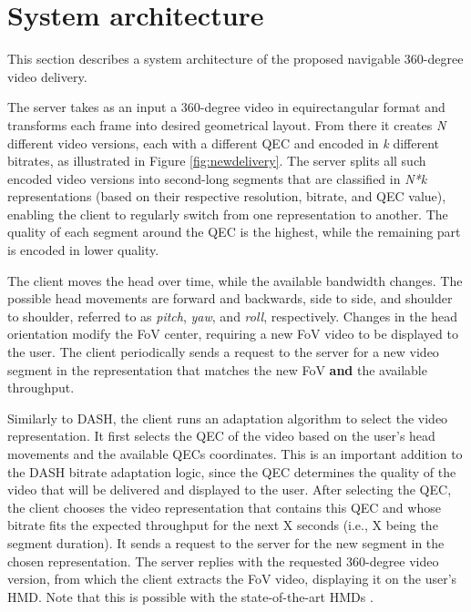 \section{System architecture}

This section describes a system architecture of the proposed navigable 360-degree video delivery. %

 The server takes as an input a 360-degree video in equirectangular format and transforms each frame into desired geometrical layout. From there it creates \textit{N} different video versions, each with a different QEC and encoded in \textit{k} different bitrates, as illustrated in Figure \ref{fig:newdelivery}. The server splits all such encoded video versions into second-long segments that are classified in \textit{N*k} representations (based on their respective resolution, bitrate, and QEC value), enabling the client to regularly switch from one representation to another. The quality of each segment around the QEC is the highest, while the remaining part is encoded in lower quality.



 The client moves the head over time, while the available bandwidth changes. The possible head movements are forward and backwards, side to side, and shoulder to shoulder, referred to as \emph{pitch}, \emph{yaw}, and \emph{roll}, respectively. Changes in the head orientation modify the FoV center, requiring a new FoV video to be displayed to the user. The client periodically sends a request to the server for a new video segment in the representation that matches the new FoV \textbf{and} the available throughput.

 Similarly to DASH, the client runs an adaptation algorithm to select the video representation.
It first selects the QEC of the video based on the user's head movements and the available QECs coordinates. This is an important addition to the DASH bitrate adaptation logic, since the QEC determines the quality of the video that will be delivered and displayed to the user. After selecting the QEC, the client chooses the video representation that contains this QEC and whose bitrate fits the expected throughput for the next X seconds (i.e., X being the segment duration). It sends a request to the server for the new segment in the chosen representation. The server replies with the requested 360-degree video version, from which the client extracts the FoV video, displaying it on the user's HMD. Note that this is possible with the state-of-the-art HMDs \cite{fovhmds}. %

